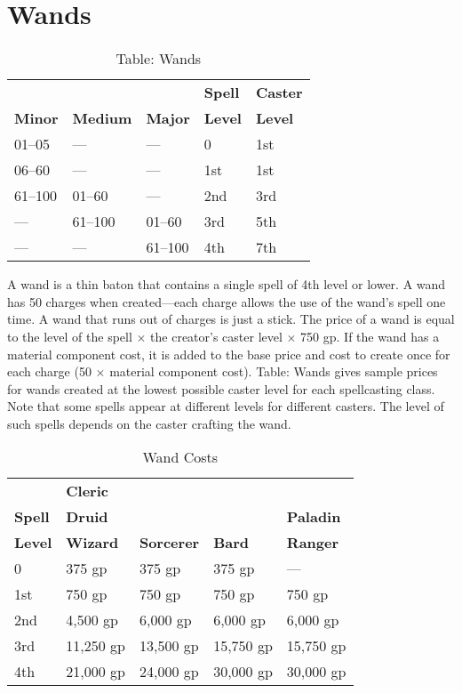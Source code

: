 \section{Wands}

\label{f0}
\begin{table}[]
\sffamily
\caption{Table: Wands}
\begin{tabular}{lllll}
               &                 &                & \textbf{Spell} & \textbf{Caster}\\
\textbf{Minor} & \textbf{Medium} & \textbf{Major} & \textbf{Level} & \textbf{Level}\\
 01--05 & --- & --- & 0 & 1st\\
 06--60 & --- & --- & 1st & 1st\\
 61--100 & 01--60 & --- & 2nd & 3rd\\
 --- & 61--100 & 01--60 & 3rd & 5th\\
 --- & --- & 61--100 & 4th & 7th\\
\end{tabular}
\end{table}

				
A wand is a thin baton that contains a single spell of 4th level or lower. A wand has 50 charges when created---each charge allows the use of the wand's spell one time. A wand that runs out of charges is just a stick. The price of a wand is equal to the level of the spell \mbox{$\times$} the creator's caster level \mbox{$\times$} 750 gp. If the wand has a material component cost, it is added to the base price and cost to create once for each charge (50 \mbox{$\times$} material component cost). Table: Wands gives sample prices for wands created at the lowest possible caster level for each spellcasting class. Note that some spells appear at different levels for different casters. The level of such spells depends on the caster crafting the wand.

\begin{table}
 \sffamily
 \caption{Wand Costs}
 \begin{tabular}{lllll}
               & \textbf{Cleric} & \\
\textbf{Spell} & \textbf{Druid}  &                   &               & \textbf{Paladin} \\
\textbf{Level} & \textbf{Wizard} & \textbf{Sorcerer} & \textbf{Bard} & \textbf{Ranger} \\
0 & 375 gp & 375 gp & 375 gp & ---\\
1st & 750 gp & 750 gp & 750 gp & 750 gp\\
2nd & 4,500 gp & 6,000 gp & 6,000 gp & 6,000 gp\\
3rd & 11,250 gp & 13,500 gp & 15,750 gp & 15,750 gp\\
4th & 21,000 gp & 24,000 gp & 30,000 gp & 30,000 gp\\  
 \end{tabular}

\end{table}

